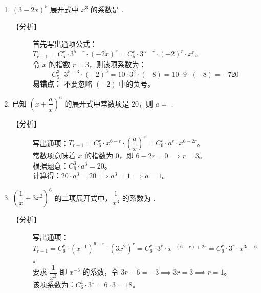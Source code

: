 \documentclass[11pt,a4paper]{article}
\newlength{\myspace}             %
\begin{document}
\begin{enumerate}[label=\arabic*., leftmargin=1.5em]

    \item $(3-2x)^5$ 展开式中 $x^3$ 的系数是 \underline{\hspace{2cm}}. 
   
    
    \begin{description}
        \item[【分析】] 
        首先写出通项公式：$T_{r+1} = C_5^r \cdot 3^{5-r} \cdot (-2x)^r = C_5^r \cdot 3^{5-r} \cdot (-2)^r \cdot x^r$。\\
        令 $x$ 的指数 $r=3$，则该项系数为：
        \[ C_5^3 \cdot 3^{5-3} \cdot (-2)^3 = 10 \cdot 3^2 \cdot (-8) = 10 \cdot 9 \cdot (-8) = -720 \]
        \textbf{易错点：} 不要忽略 $(-2)$ 中的负号。
    \end{description}

    \vspace{\myspace}

    \item 已知 $\left( x + \dfrac{a}{x} \right)^6$ 的展开式中常数项是 $20$，则 $a = $ \underline{\hspace{2cm}}.
  
    
    \begin{description}
        \item[【分析】] 
        写出通项：$T_{r+1} = C_6^r \cdot x^{6-r} \cdot \left( \dfrac{a}{x} \right)^r = C_6^r \cdot a^r \cdot x^{6-2r}$。\\
        常数项意味着 $x$ 的指数为 $0$，即 $6-2r = 0 \implies r=3$。\\
        根据题意：$C_6^3 \cdot a^3 = 20$。\\
        计算得：$20 \cdot a^3 = 20 \implies a^3 = 1 \implies a=1$。
    \end{description}

    \vspace{\myspace}

    \item $\left( \dfrac{1}{x} + 3x^2 \right)^6$ 的二项展开式中，$\dfrac{1}{x^3}$ 的系数为 \underline{\hspace{2cm}}.
    
    \begin{description}
        \item[【分析】] 
        写出通项：$T_{r+1} = C_6^r \cdot (x^{-1})^{6-r} \cdot (3x^2)^r = C_6^r \cdot 3^r \cdot x^{-(6-r) + 2r} = C_6^r \cdot 3^r \cdot x^{3r-6}$。\\
        要求 $\dfrac{1}{x^3}$ 即 $x^{-3}$ 的系数，令 $3r-6 = -3 \implies 3r = 3 \implies r=1$。\\
        该项系数为：$C_6^1 \cdot 3^1 = 6 \cdot 3 = 18$。
    \end{description}

\end{enumerate}
\end{document}
